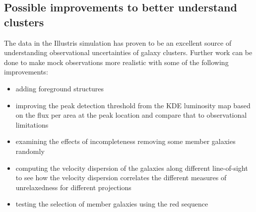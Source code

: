 \subsection{Possible improvements to better understand clusters}
The data in the Illustris simulation has proven to be an excellent source of
understanding observational uncertainties of galaxy clusters.
Further work can be done to make mock observations more realistic with some of
the following improvements:
\begin{itemize}
		\item adding foreground structures 
		\item improving the peak detection threshold from the KDE luminosity map based on
			the flux per area at the peak location and compare that to observational
			limitations
		\item examining the effects of incompleteness removing some member galaxies randomly 
		\item computing the velocity dispersion of the galaxies along different
			line-of-sight to see how the velocity dispersion correlates the different
			measures of unrelaxedness for different projections
		\item testing the selection of member galaxies using the red sequence
	\end{itemize}


